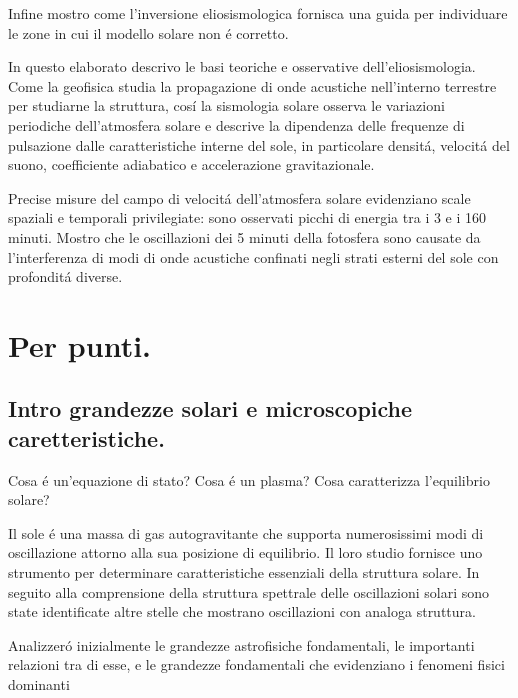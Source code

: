 Infine mostro come l'inversione eliosismologica fornisca una guida per individuare le zone in cui il modello solare non \'e corretto.



In questo elaborato descrivo le basi teoriche e osservative dell'eliosismologia. Come la geofisica studia la propagazione di onde acustiche nell'interno terrestre per studiarne la struttura, cos\'i la sismologia solare osserva le variazioni periodiche dell'atmosfera solare e descrive la dipendenza delle frequenze di pulsazione dalle caratteristiche interne del sole, in particolare densit\'a, velocit\'a del suono, coefficiente adiabatico e accelerazione gravitazionale. 



Precise misure del campo di velocit\'a dell'atmosfera solare evidenziano scale spaziali e temporali privilegiate: sono osservati picchi di energia tra i 3 e i 160 minuti. Mostro che le oscillazioni dei 5 minuti della fotosfera sono causate da l'interferenza di modi di onde acustiche confinati negli strati esterni del sole con profondit\'a diverse.

\printbibliography[heading=subbibintoc]


\chapter{Per punti.}
\PartialToc


\section{Intro grandezze solari e microscopiche caretteristiche.}

 Cosa \'e un'equazione di stato? Cosa \'e un plasma? Cosa caratterizza l'equilibrio solare? 

Il sole \'e una massa di gas autogravitante che supporta numerosissimi modi di oscillazione attorno alla sua posizione di equilibrio. Il loro studio fornisce uno strumento per determinare caratteristiche essenziali della struttura solare. In seguito alla comprensione della struttura spettrale delle oscillazioni solari sono state identificate altre stelle che mostrano oscillazioni con analoga struttura.

Analizzer\'o inizialmente le grandezze astrofisiche fondamentali, le importanti relazioni tra di esse, e le grandezze fondamentali che evidenziano i fenomeni fisici dominanti

